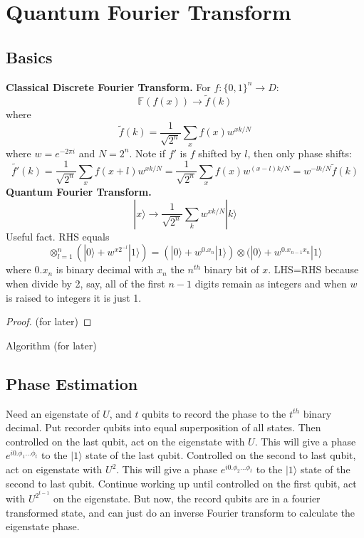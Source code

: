 \documentclass[12pt]{article}
\begin{document}
\section{Quantum Fourier Transform}
\subsection{Basics}
{\bf Classical Discrete Fourier Transform.} For $f:\{0,1\}^n\rightarrow D$: $$\mathbb{F}(f(x))\rightarrow\tilde{f}(k)$$ where $$\tilde{f}(k)=\frac{1}{\sqrt{2^n}}\sum_xf(x)w^{xk/N}$$ where $w=e^{-2\pi i}$ and $N=2^n$. Note if $f'$ is $f$ shifted by $l$, then only phase shifts:
$$\tilde{f'}(k)=\frac{1}{\sqrt{2^n}}\sum_xf(x+l)w^{xk/N}=\frac{1}{\sqrt{2^n}}\sum_xf(x)w^{(x-l)k/N}=w^{-lk/N}\tilde{f}(k)$$
{\bf Quantum Fourier Transform.} $$|x\rangle\rightarrow\frac{1}{\sqrt{2^n}}\sum_k w^{xk/N}|k\rangle$$
Useful fact. RHS equals
$$\otimes_{l=1}^n(|0\rangle+w^{x2^{-l}}|1\rangle)=(|0\rangle+w^{0.x_n}|1\rangle)\otimes(|0\rangle+w^{0.x_{n-1}x_n}|1\rangle$$
where $0.x_n$ is binary decimal with $x_n$ the $n^{th}$ binary bit of $x$. LHS=RHS because when divide by 2, say, all of the first $n-1$ digits remain as integers and when $w$ is raised to integers it is just 1. 

\begin{proof} (for later)
\end{proof}

\noindent Algorithm (for later)

\subsection{Phase Estimation}

Need an eigenstate of $U$, and $t$ qubits to record the phase to the $t^{th}$ binary decimal. Put recorder qubits into equal superposition of all states. Then controlled on the last qubit, act on the eigenstate with $U$. This will give a phase $e^{i0.\phi_1\dots\phi_t}$ to the $|1\rangle$ state of the last qubit. Controlled on the second to last qubit, act on eigenstate with $U^2$. This will give a phase $e^{i0.\phi_2\dots\phi_{t}}$ to the $|1\rangle$ state of the second to last qubit. Continue working up until controlled on the first qubit, act with $U^{2^{t-1}}$ on the eigenstate. But now, the record qubits are in a fourier transformed state, and can just do an inverse Fourier transform to calculate the eigenstate phase.
\end{document}

